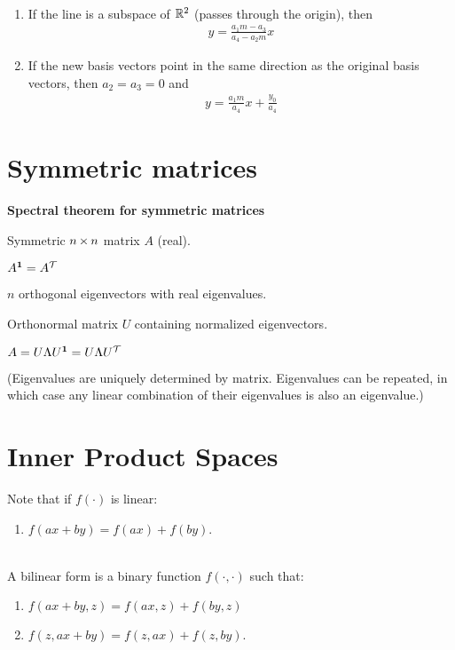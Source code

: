 \begin{example*}~\\
  \begin{enumerate}
  \item If the line is a subspace of $\mathbb{R}^2$ (passes through the origin), then
    \begin{align*}
      y = \frac{a_1m - a_3}{a_4 - a_2m}x
    \end{align*}
  \item If the new basis vectors point in the same direction as the original basis vectors, then
    $a_2 = a_3 = 0$ and
    \begin{align*}
      y = \frac{a_1m}{a_4}x + \frac{y_0}{a_4}
    \end{align*}
  \end{enumerate}
\end{example*}
\newpage
\section{Symmetric matrices}

\textbf{Spectral theorem for symmetric matrices}

Symmetric $n \operatorname{\times} n$ matrix $A$ (real).

$A^{\mathbf 1} = A^\mathcal T$

$n$ orthogonal eigenvectors with real eigenvalues.

Orthonormal matrix $U$ containing normalized eigenvectors.

$A = U\Lambda U^{\mathbf 1} = U\Lambda U^\mathcal T$

(Eigenvalues are uniquely determined by matrix. Eigenvalues can be repeated, in which case any linear combination of their
eigenvalues is also an eigenvalue.)

\section{Inner Product Spaces}

Note that if $f(\cdot)$ is linear:
\begin{enumerate}
\item $f(ax + by) = f(ax) + f(by)$.
\end{enumerate}

\begin{definition*}~\\
  A bilinear form is a binary function $f(\cdot, \cdot)$ such that:
  \begin{enumerate}
  \item $f(ax + by, z) = f(ax, z) + f(by, z)$
  \item $f(z, ax + by) = f(z, ax) + f(z, by)$.
  \end{enumerate}
\end{definition*}



